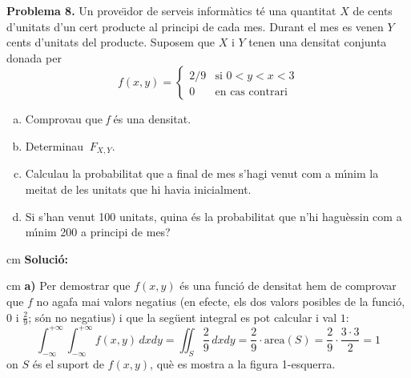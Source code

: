 \documentclass{article}
\begin{document}
\newpage
\noindent
\textbf{Problema 8.}
Un prove\"{\i}dor de serveis inform\`atics t\'e una quantitat $X$ de
cents d'unitats d'un cert producte al principi de cada mes. Durant
el mes es venen $Y$ cents d'unitats del producte. Suposem que $X$
 i $Y$ tenen una densitat conjunta donada per
\[
f(x,y) = \begin{cases}2/9 & \text{si } 0 < y < x < 3\\
0 & \text{en cas contrari}\end{cases}
\]
\begin{enumerate}[a)]
\item Comprovau que {\it f} \'es una densitat.
\item Determinau $\> F_{X,Y}.$
\item Calculau la probabilitat que a final de mes s'hagi venut com a
m\'{\i}nim la meitat de les unitats que hi havia inicialment.
\item Si s'han venut 100 unitats, quina \'es la probabilitat que n'hi hagu\`essin
com a m\'\i nim 200 a principi de mes?
\end{enumerate}

 cm
\noindent
\textbf{Soluci\'o:}


 cm
\noindent
\textbf{a)} Per demostrar que $f(x, y)$ \'es una funci\'o de densitat hem de 
comprovar que $f$ no agafa mai valors negatius (en efecte, els dos valors
posibles de la funci\'o, $0$ i $\frac{2}{9}$; s\'on no negatius) i que la 
seg\"uent integral es pot calcular i val $1$:
\[
\int_{-\infty}^{+\infty} \int_{-\infty}^{+\infty} f(x, y) \, dxdy=\iint_S \frac{2}{9} \,dxdy=
\frac{2}{9} \cdot \text{area}(S)=\frac{2}{9} \cdot \frac{3 \cdot 3}{2}=1
\]
\noindent
on $S$ \'es el suport de $f(x, y)$, qu\`e es mostra a la figura 1-esquerra.
\end{document}
